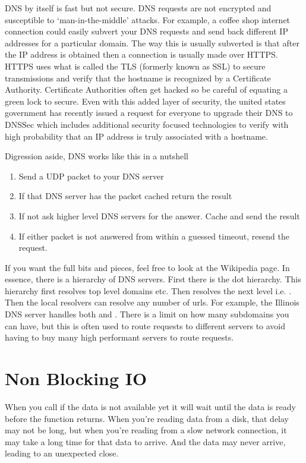 DNS by itself is fast but not secure.
DNS requests are not encrypted and susceptible to `man-in-the-middle' attacks.
For example, a coffee shop internet connection could easily subvert your DNS requests and send back different IP addresses for a particular domain.
The way this is usually subverted is that after the IP address is obtained then a connection is usually made over HTTPS.
HTTPS uses what is called the TLS (formerly known as SSL) to secure transmissions and verify that the hostname is recognized by a Certificate Authority.
Certificate Authorities often get hacked so be careful of equating a green lock to secure.
Even with this added layer of security, the united states government has recently issued a request for everyone to upgrade their DNS to DNSSec which includes additional security focused technologies to verify with high probability that an IP address is truly associated with a hostname.

Digression aside, DNS works like this in a nutshell
\begin{enumerate}
\item Send a UDP packet to your DNS server
\item If that DNS server has the packet cached return the result
\item If not ask higher level DNS servers for the answer. Cache and send the result
  \item If either packet is not answered from within a guessed timeout, resend the request.
\end{enumerate}

If you want the full bits and pieces, feel free to look at the Wikipedia page.
In essence, there is a hierarchy of DNS servers.
First there is the dot hierarchy.
This hierarchy first resolves top level domains   etc.
Then resolves the next level i.e. .
Then the local resolvers can resolve any number of urls.
For example, the Illinois DNS server handles both  and . There is a limit on how many subdomains you can have, but this is often used to route requests to different servers to avoid having to buy many high performant servers to route requests.

\section{Non Blocking IO}

When you call  if the data is not available yet it will wait until the data is ready before the function returns.
When you're reading data from a disk, that delay may not be long, but when you're reading from a slow network connection, it may take a long time for that data to arrive.
And the data may never arrive, leading to an unexpected close.


